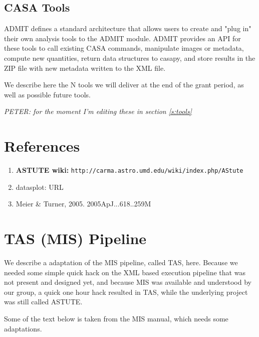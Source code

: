 \documentclass[preprint]{aastex} %
\begin{document}
\subsection{ CASA Tools }

ADMIT defines a standard architecture that allows users to create and
"plug in" their own analysis tools to the ADMIT module.  ADMIT provides
an API for these tools to call existing CASA commands, manipulate images
or metadata, compute new quantities, return data structures to casapy,
and store results in the ZIP file with new metadata written to the XML file.

We describe here the N tools we will deliver at the end of the grant
period, as well as possible future tools.

{\it  PETER: for the moment I'm editing these in section \ref{s:tools}}



\section*{References}

\begin{enumerate}
\item
{\bf ASTUTE wiki:} {\tt  http://carma.astro.umd.edu/wiki/index.php/AStute}

\item
datasplot: URL

\item
Meier \& Turner, 2005. 2005ApJ...618..259M

\end{enumerate}




\section{TAS (MIS) Pipeline}

We describe a adaptation of the MIS pipeline, called TAS, here. Because we
needed some simple quick hack on the XML based execution pipeline that was
not present and designed yet, and because MIS was available and understood
by our group, a quick one hour hack resulted in TAS, while the underlying
project was still called ASTUTE.

Some of the text below is taken from the MIS manual, which needs some adaptations.
\end{document}
